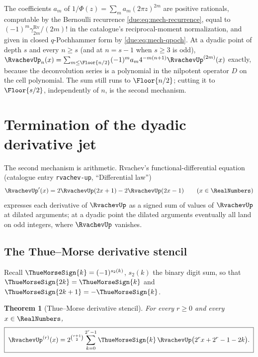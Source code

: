 \documentclass[11pt,oneside]{article}
\theoremstyle{plain}
\newtheorem{theorem}{Theorem}[section]
\theoremstyle{definition}
\theoremstyle{remark}
\newcommand{\upn}[1]{\RvachevUp_{#1}}
\newcommand{\PhiUp}{\Phi}                                   %
\newcommand{\am}[1]{a_{#1}}                                 %
\begin{document}
\begin{summarybox}[title={What the first mechanism delivers}]
The coefficients \(\am{m}\) of \(1/\PhiUp(z)=\sum_m\am{m}(2\pi z)^{2m}\) are
positive rationals, computable by the Bernoulli recurrence
\cref{due:eq:mech-recurrence}, equal to \((-1)^{m}\gamma^{\mathrm{Rv}}_{2m}/(2m)!\)
in the catalogue's reciprocal-moment normalization, and given in closed
\(q\)-Pochhammer form by \cref{due:eq:mech-qpoch}.  At a dyadic point of
depth \(s\) and every \(n\ge s\) (and at \(n=s-1\) when \(s\ge3\) is odd),
\(\upn{n}(x)=\sum_{m\le\Floor{n/2}}(-1)^{m}\am{m}4^{-m(n+1)}\RvachevUp^{(2m)}(x)\)
exactly, because the deconvolution series is a polynomial in the nilpotent
operator \(D\) on the cell polynomial.  The sum still runs to
\(\Floor{n/2}\); cutting it to \(\Floor{s/2}\), independently of \(n\), is
the second mechanism.
\end{summarybox}

\section{Termination of the dyadic derivative jet}
\label{due:sec:jet}

The second mechanism is arithmetic.  Rvachev's functional-differential
equation (catalogue entry \texttt{rvachev-up}, ``Differential law'')
\begin{equation}
 \RvachevUp'(x)=2\RvachevUp(2x+1)-2\RvachevUp(2x-1)\qquad(x\in\RealNumbers)
 \label{due:eq:mech-refinement}
\end{equation}
expresses each derivative of \(\RvachevUp\) as a signed sum of values of
\(\RvachevUp\) at dilated arguments; at a dyadic point the dilated arguments
eventually all land on odd integers, where \(\RvachevUp\) vanishes.

\subsection{The Thue--Morse derivative stencil}

Recall \(\ThueMorseSign{k}=(-1)^{s_2(k)}\), \(s_2(k)\) the binary digit sum, so
that \(\ThueMorseSign{2k}=\ThueMorseSign{k}\) and
\(\ThueMorseSign{2k+1}=-\ThueMorseSign{k}\).

\begin{theorem}[Thue--Morse derivative stencil]
\label{due:thm:mech-stencil}
For every \(r\ge0\) and every \(x\in\RealNumbers\),
\begin{equation}
 \boxed{\;
 \RvachevUp^{(r)}(x)=2^{\binom{r+1}{2}}
 \sum_{k=0}^{2^{r}-1}\ThueMorseSign{k}\,
 \RvachevUp\bigl(2^{r}x+2^{r}-1-2k\bigr).\;}
 \label{due:eq:mech-stencil}
\end{equation}
\end{theorem}
\end{document}
